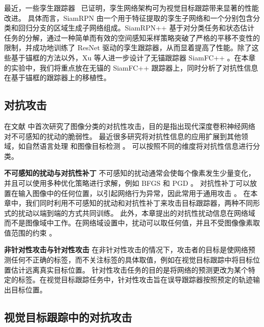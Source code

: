 最近，一些孪生跟踪器~\cite{SiamRPN,SiamRPN++,SiamFC++} 已证明，孪生网络架构可为视觉目标跟踪带来显著的性能改进。
具体而言，SiamRPN \cite{SiamRPN} 由一个用于特征提取的孪生子网络和一个分别包含分类和回归分支的区域生成子网络组成。SiamRPN++ \cite{SiamRPN++} 基于对分类任务和状态估计任务的分解，通过一种简单而有效的空间感知采样策略突破了严格的平移不变性的限制，并成功地训练了 ResNet 驱动的孪生跟踪器，从而显着提高了性能。除了这些基于锚框的方法以外，Xu 等人进一步设计了无锚跟踪器 SiamFC++ \cite{SiamFC++}。在本章的实验中，我们将重点放在无锚的 SiamFC++ 跟踪器上，同时分析了对抗性信息在基于锚框的跟踪器上的移植性。

\subsection{对抗攻击}

在文献 \cite{intriguing} 中首次研究了图像分类的对抗性攻击，目的是指出现代深度卷积神经网络对不可感知的扰动的脆弱性。
最近很多研究将对抗性信息的应用扩展到其他领域，如自然语言处理 \cite{generating} 和图像目标检测 \cite{wei2019transferable}。
可以按照不同的维度将对抗性信息进行分类。

\textbf{不可感知的扰动与对抗性补丁} 不可感知的扰动通常会使每个像素发生少量变化，并且可以使用多种优化策略进行求解，例如 BFGS \cite{intriguing} 和 PGD \cite{PGD}。
对抗性补丁可以放置在输入图像中的任何位置，以引起网络行为异常，因此常用于通用攻击 \cite{patch}。
在本章中，我们同时利用不可感知的扰动和对抗性补丁来攻击目标跟踪器，两种不同形式的扰动以端到端的方式共同训练。
此外，本章提出的对抗性扰动信息在网络域而不是图像域中工作。在网络域设置中，扰动可以取任何值，并且不受图像像素取值范围的约束 \cite{karmon2018lavan}。

\textbf{非针对性攻击与针对性攻击} 在非针对性攻击的情况下，攻击者的目标是使网络预测任何不正确的标签，而不关注标签的具体取值，例如在视觉目标跟踪中将目标位置估计远离真实目标位置。
针对性攻击任务的目的是将网络的预测更改为某个特定的标签。在视觉目标跟踪任务中，针对性攻击旨在误导跟踪器按照预定的轨迹输出目标位置。

\subsection{视觉目标跟踪中的对抗攻击}

